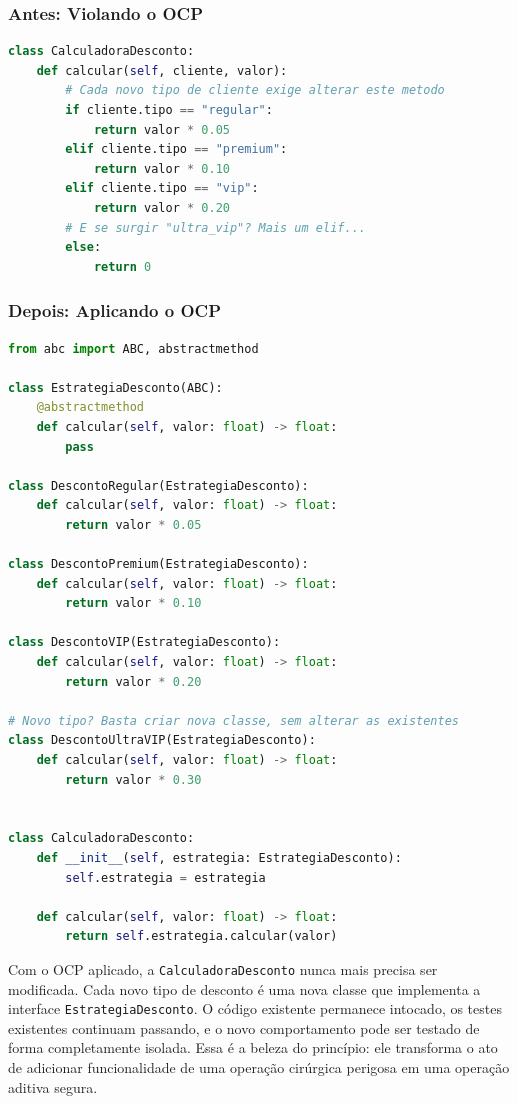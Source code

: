 \subsubsection{Antes: Violando o OCP}

\begin{lstlisting}[language=Python, caption={Violação do OCP: cada novo tipo exige modificação}]
class CalculadoraDesconto:
    def calcular(self, cliente, valor):
        # Cada novo tipo de cliente exige alterar este metodo
        if cliente.tipo == "regular":
            return valor * 0.05
        elif cliente.tipo == "premium":
            return valor * 0.10
        elif cliente.tipo == "vip":
            return valor * 0.20
        # E se surgir "ultra_vip"? Mais um elif...
        else:
            return 0
\end{lstlisting}

\subsubsection{Depois: Aplicando o OCP}

\begin{lstlisting}[language=Python, caption={OCP aplicado: extensão sem modificação}]
from abc import ABC, abstractmethod

class EstrategiaDesconto(ABC):
    @abstractmethod
    def calcular(self, valor: float) -> float:
        pass

class DescontoRegular(EstrategiaDesconto):
    def calcular(self, valor: float) -> float:
        return valor * 0.05

class DescontoPremium(EstrategiaDesconto):
    def calcular(self, valor: float) -> float:
        return valor * 0.10

class DescontoVIP(EstrategiaDesconto):
    def calcular(self, valor: float) -> float:
        return valor * 0.20

# Novo tipo? Basta criar nova classe, sem alterar as existentes
class DescontoUltraVIP(EstrategiaDesconto):
    def calcular(self, valor: float) -> float:
        return valor * 0.30


class CalculadoraDesconto:
    def __init__(self, estrategia: EstrategiaDesconto):
        self.estrategia = estrategia

    def calcular(self, valor: float) -> float:
        return self.estrategia.calcular(valor)
\end{lstlisting}

Com o OCP aplicado, a \texttt{CalculadoraDesconto} nunca mais precisa ser
modificada. Cada novo tipo de desconto é uma nova classe que implementa a
interface \texttt{EstrategiaDesconto}. O código existente permanece intocado,
os testes existentes continuam passando, e o novo comportamento pode ser
testado de forma completamente isolada. Essa é a beleza do princípio: ele
transforma o ato de adicionar funcionalidade de uma operação cirúrgica
perigosa em uma operação aditiva segura.


